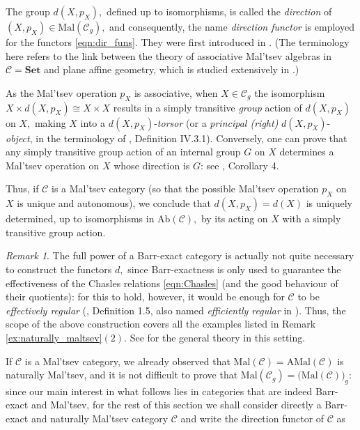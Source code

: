 \documentclass[11pt]{amsart}
\theoremstyle{plain}
\theoremstyle{definition}
\theoremstyle{remark}
\newtheorem{remark}[subsubsection]{Remark}
\begin{document}
The group $d(X,p_X),$ defined up to isomorphisms, is called the \emph{direction} of $(X,p_X)\in\mathrm{Mal}(\mathcal{C}_g),$ and consequently, the name \emph{direction functor} is employed for the functors \eqref{eqn:dir_funs}. They were first introduced in \cite{baer-sums}. (The terminology here refers to the link between the theory of associative Mal'tsev algebras in $\mathcal{C}=\mathbf{Set}$ and plane affine geometry, which is studied extensively in \cite{bourn-affine}.)

As the Mal'tsev operation $p_X$ is associative, when $X\in\mathcal{C}_g$ the isomorphism $X\times d(X,p_X)\cong X\times X$ results in a simply transitive \emph{group} action of $d(X,p_X)$ on $X,$ making $X$ into a $d(X,p_X)$-\emph{torsor} \cite{torsors} (or a \emph{principal (right)} $d(X,p_X)$-\emph{object}, in the terminology of \cite{barr}, Definition IV.3.1). Conversely, one can prove that any simply transitive group action of an internal group $G$ on $X$ determines a Mal'tsev operation on $X$ whose direction is $G$: see \cite{baer-sums}, Corollary 4.

Thus, if $\mathcal{C}$ is a Mal'tsev category (so that the possible Mal'tsev operation $p_X$ on $X$ is unique and autonomous), we conclude that $d(X,p_X)=d(X)$ is uniquely determined, up to isomorphisms in $\mathrm{Ab}(\mathcal{C}),$ by its acting on $X$ with a simply transitive group action.
\begin{remark}
The full power of a Barr-exact category is actually not quite necessary to construct the functors $d,$ since Barr-exactness is only used to guarantee the effectiveness of the Chasles relations \eqref{eqn:Chasles} (and the good behaviour of their quotients): for this to hold, however, it would be enough for $\mathcal{C}$ to be \emph{effectively regular} (\cite{bourn-rodelo}, Definition 1.5, also named \emph{efficiently regular} in \cite{efficiently}). Thus, the scope of the above construction covers all the examples listed in Remark \ref{ex:naturally_maltsev}$(2).$ See \cite{bourn-rodelo} for the general theory in this setting.
\end{remark}

If $\mathcal{C}$ is a Mal'tsev category, we already observed that $\mathrm{Mal}(\mathcal{C})=\mathrm{AMal}(\mathcal{C})$ is naturally Mal'tsev, and it is not difficult to prove that $\mathrm{Mal}(\mathcal{C}_g)=\big(\mathrm{Mal}(\mathcal{C})\big)_g$: since our main interest in what follows lies in categories that are indeed Barr-exact and Mal'tsev, for the rest of this section we shall consider directly a Barr-exact and naturally Mal'tsev category $\mathcal{C}$ and write the direction functor of $\mathcal{C}$ as
\end{document}

